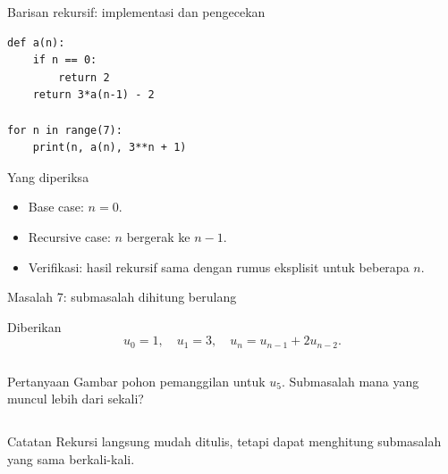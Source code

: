 \documentclass[aspectratio=169,11pt]{beamer}
\begin{document}
\begin{frame}[fragile]{Barisan rekursif: implementasi dan pengecekan}
\begin{lstlisting}
def a(n):
    if n == 0:
        return 2
    return 3*a(n-1) - 2

for n in range(7):
    print(n, a(n), 3**n + 1)
\end{lstlisting}
\pause
\begin{block}{Yang diperiksa}
\begin{itemize}
  \item Base case: $n=0$.
  \item Recursive case: $n$ bergerak ke $n-1$.
  \item Verifikasi: hasil rekursif sama dengan rumus eksplisit untuk beberapa $n$.
\end{itemize}
\end{block}
\end{frame}

\begin{frame}{Masalah 7: submasalah dihitung berulang}
\begin{block}{Diberikan}
\[
u_0=1,\quad u_1=3,\quad u_n=u_{n-1}+2u_{n-2}.
\]
\end{block}
\begin{columns}[T]
\begin{block}{Pertanyaan}
Gambar pohon pemanggilan untuk $u_5$. Submasalah mana yang muncul lebih dari sekali?
\end{block}
\end{columns}
\pause
\begin{alertblock}{Catatan}
Rekursi langsung mudah ditulis, tetapi dapat menghitung submasalah yang sama berkali-kali.
\end{alertblock}
\end{frame}
\end{document}
